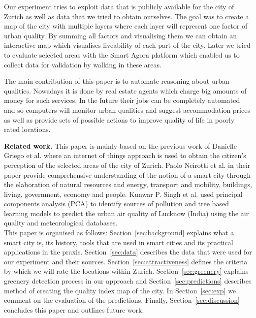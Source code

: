 \documentclass[letterpaper]{article}
\newcommand{\mypar}[1]{{\bf #1.}}
\begin{document}
\indent Our experiment tries to exploit data that is publicly available for the city of Zurich as well as data that we tried to obtain ourselves.
The goal was to create a map of the city with multiple layers where each layer will represent one factor of urban quality. By summing all factors and
visualising them we can obtain an interactive map which visualises liveability of each part of the city. Later we tried to evaluate selected areas with the Smart
Agora platform which enabled us to collect data for validation by walking in these areas.

\indent The main contribution of this paper is to automate reasoning about urban qualities. Nowadays it is done by
real estate agents which charge big amounts of money for such services. In the future their jobs can be
completely automated and so computers will monitor urban qualities and suggest accommodation prices as well as
provide sets of possible actions to improve quality of life in poorly rated locations.

\mypar{Related work} This paper is mainly based on the previous work of Danielle Griego et al. \cite{smartCities}
where an internet of things approach is used to obtain the citizen's perception of the selected areas of the city of Zurich.
Paolo Neirotti et al. \cite{smartCities2} in their paper provide comprehensive understanding of the notion of a smart city
through the elaboration of natural resources and energy, transport and mobility, buildings, living, government, economy
and people. Kunwar P. Singh et al. \cite{pollution} used principal components analysis (PCA) to identify sources
of pollution and tree based learning models to predict the urban air quality of Lucknow (India) using the air quality
and meteorological databases.
\\
\indent This paper is organised as follows: Section~\ref{sec:background} explains what a smart city is, its history, tools that are used
in smart cities and its practical applications in the praxis. Section~\ref{sec:data} describes the data that were used for our
experiment and their sources. Section~\ref{sec:attractiveness} defines the criteria by which we will rate the locations within Zurich.
Section~\ref{sec:greenery} explains greenery detection process in our approach and Section~\ref{sec:predictions} describes method of creating the quality index
map of the city. In Section~\ref{sec:exp} we comment on the evaluation of the predictions. Finally, Section~\ref{sec:discussion} concludes this
paper and outlines future work.
\end{document}

